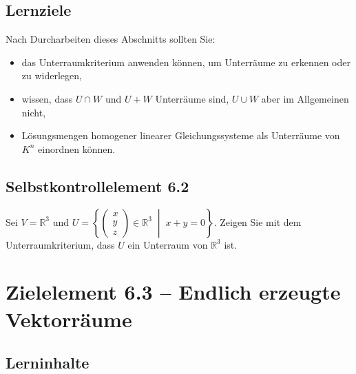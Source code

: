 \documentclass[a4paper,12pt]{article}
\begin{document}
\subsection*{Lernziele}

Nach Durcharbeiten dieses Abschnitts sollten Sie:
\begin{itemize}
  \item das Unterraumkriterium anwenden können, um Unterräume zu erkennen oder
        zu widerlegen,
  \item wissen, dass $U \cap W$ und $U + W$ Unterräume sind, $U \cup W$ aber
        im Allgemeinen nicht,
  \item Lösungsmengen homogener linearer Gleichungssysteme als Unterräume von $K^n$
        einordnen können.
\end{itemize}

\subsection*{Selbstkontrollelement 6.2}

Sei $V = \mathbb{R}^3$ und
$U = \left\{ \begin{pmatrix} x \\ y \\ z \end{pmatrix} \in \mathbb{R}^3 \;\middle|\; x + y = 0 \right\}$.
Zeigen Sie mit dem Unterraumkriterium, dass $U$ ein Unterraum von $\mathbb{R}^3$ ist.

\newpage

\section*{Zielelement 6.3 -- Endlich erzeugte Vektorräume}

\subsection*{Lerninhalte}

\begin{center}
\end{center}
\end{document}
